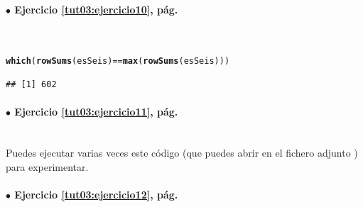 \documentclass[10pt,a4paper]{article}\usepackage[]{graphicx}\usepackage[]{color}
\makeatletter
\newcommand{\hlopt}[1]{\textcolor[rgb]{0,0,0}{#1}}%
\newcommand{\hlstd}[1]{\textcolor[rgb]{0.345,0.345,0.345}{#1}}%
\newcommand{\hlkwd}[1]{\textcolor[rgb]{0.737,0.353,0.396}{\textbf{#1}}}%
\newenvironment{kframe}{%
 \def\at@end@of@kframe{}%
 \ifinner\ifhmode%
  \def\at@end@of@kframe{\end{minipage}}%
  \begin{minipage}{\columnwidth}%
 \fi\fi%
 \def\FrameCommand##1{\hskip\@totalleftmargin \hskip-\fboxsep
 \colorbox{shadecolor}{##1}\hskip-\fboxsep
     \hskip-\linewidth \hskip-\@totalleftmargin \hskip\columnwidth}%
 \MakeFramed {\advance\hsize-\width
   \@totalleftmargin\z@ \linewidth\hsize
   \@setminipage}}%
 {\par\unskip\endMakeFramed%
 \at@end@of@kframe}
\newenvironment{knitrout}{}{} %
\makeatother
\begin{document}
\paragraph{\bf $\bullet$ Ejercicio \ref{tut03:ejercicio10}, pág. \pageref{tut03:ejercicio10}}
\label{tut03:ejercicio10:sol}\quad\\

\begin{knitrout}
\color{fgcolor}\begin{kframe}
\begin{alltt}
\hlkwd{which}\hlstd{(}\hlkwd{rowSums}\hlstd{(esSeis)} \hlopt{==} \hlkwd{max}\hlstd{(}\hlkwd{rowSums}\hlstd{(esSeis)))}
\end{alltt}
\begin{verbatim}
## [1] 602
\end{verbatim}
\end{kframe}
\end{knitrout}

\paragraph{\bf $\bullet$ Ejercicio \ref{tut03:ejercicio11}, pág. \pageref{tut03:ejercicio11}}
\label{tut03:ejercicio11:sol}\quad\\

Puedes ejecutar varias veces este código (que puedes abrir en el fichero adjunto ) para experimentar.

\begin{knitrout}
\color{fgcolor}\begin{kframe}


{\ttfamily\noindent{}}

{\ttfamily\noindent\bfseries{}}\end{kframe}
\end{knitrout}



\paragraph{\bf $\bullet$ Ejercicio \ref{tut03:ejercicio12}, pág. \pageref{tut03:ejercicio12}}
\label{tut03:ejercicio12:sol}\quad\\
\end{document}

